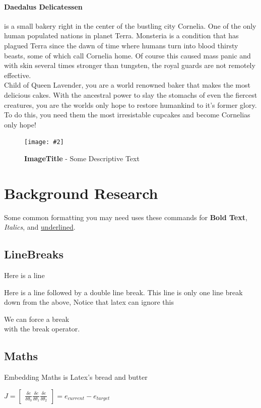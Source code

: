 \documentclass[10pt, a4paper]{article}
\newcommand{\figuremacro}[5]{
    \begin{figure}[#1]
        \centering
        \texttt{[image: \#2]}
        \caption[#3]{\textbf{#3}#4}
        \label{fig:#2}
    \end{figure}
}
\begin{document}
	\paragraph{Daedalus Delicatessen} is a small bakery right in the center of the bustling city Cornelia. One of the only
	human populated nations in planet Terra. Monsteria is a condition that has plagued Terra since the dawn of time where
	humans turn into blood thirsty beasts, some of which call Cornelia home. Of course this caused mass panic and with skin
	several times stronger than tungsten, the royal guards are not remotely effective. \\ 
	\hspace{5mm} Child of Queen Lavender, you are a world renowned baker that makes the most delicious cakes. With the
	ancestral power to slay the stomachs of even the fiercest creatures, you are the worlds only hope to restore humankind
	to it's former glory. To do this, you need them the most irresistable cupcakes and become Cornelias only hope!
    \figuremacro{h}{delicatessen}{ImageTitle}{ - Some Descriptive Text}{1.0}
	
	\section{Background Research}
	\cite{Keshav}
	\cite{sessionStorage}
	\cite{localStorage}
	Some common formatting you may need uses these commands for \textbf{Bold Text}, \textit{Italics}, and \underline{underlined}.
	\subsection{LineBreaks}
	Here is a line
    
    Here is a line followed by a double line break.
	This line is only one line break down from the above, Notice that latex can ignore this
    
    We can force a break \\ with the break operator.
    
	\subsection{Maths}
    Embedding Maths is Latex's bread and butter    
    
    {\centering \Large \(
        J = \begin{bmatrix}
            \frac{\delta e}{\delta \theta _0}
            \frac{\delta e}{\delta \theta _1}
            \frac{\delta e}{\delta \theta _2}
        \end{bmatrix}
        = e_{current} - e_{target} 
    \)\par}
	
\end{document}
